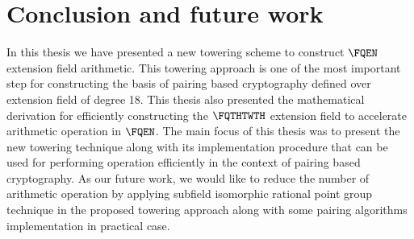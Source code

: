 \section{Conclusion and future work}
In this thesis we have presented a new towering scheme to construct $\FQEN$ extension field arithmetic. This towering approach is one of the most important step for constructing the basis of pairing based cryptography defined over extension field of degree 18. This thesis also presented the mathematical derivation for efficiently constructing the $\FQTHTWTH$ extension field to accelerate arithmetic operation in $\FQEN$. The main focus of this thesis was to present the new towering technique along with its implementation procedure that can be used for performing operation efficiently in the context of pairing based cryptography. As our future work, we would like to reduce the number of arithmetic operation by applying subfield isomorphic rational point group technique in the proposed towering approach along with some pairing algorithms implementation in practical case.
